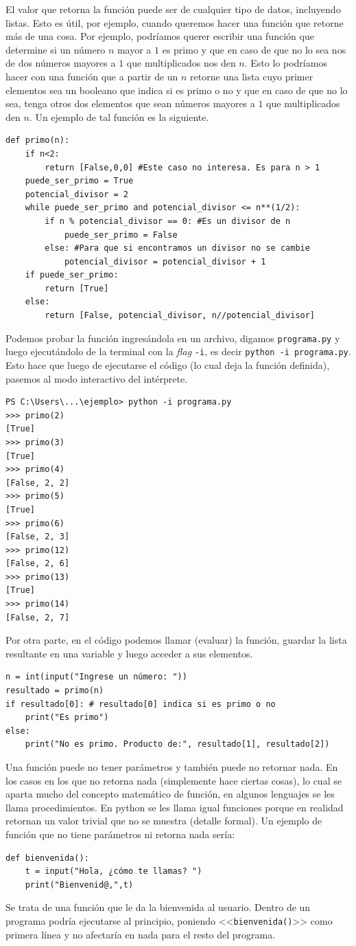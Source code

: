 \documentclass[a4paper, 12pt]{report}
\theoremstyle{definition}
\begin{document}
El valor que retorna la función puede ser de cualquier tipo de datos, incluyendo listas. Esto es útil, por ejemplo, cuando queremos hacer una función que retorne más de una cosa. Por ejemplo, podríamos querer escribir una función que determine si un número $n$ mayor a $1$ es primo y que en caso de que no lo sea nos de dos números mayores a $1$ que multiplicados nos den $n$. Esto lo podríamos hacer con una función que a partir de un $n$ retorne una lista cuyo primer elementos sea un booleano que indica si es primo o no y que en caso de que no lo sea, tenga otros dos elementos que sean números mayores a $1$ que multiplicados den $n$. Un ejemplo de tal función es la siguiente.
\begin{verbatim}
def primo(n):
    if n<2:
        return [False,0,0] #Este caso no interesa. Es para n > 1
    puede_ser_primo = True
    potencial_divisor = 2
    while puede_ser_primo and potencial_divisor <= n**(1/2):
        if n % potencial_divisor == 0: #Es un divisor de n
            puede_ser_primo = False
        else: #Para que si encontramos un divisor no se cambie
            potencial_divisor = potencial_divisor + 1
    if puede_ser_primo:
        return [True]
    else:
        return [False, potencial_divisor, n//potencial_divisor]
\end{verbatim}
Podemos probar la función ingresándola en un archivo, digamos {\tt programa.py} y luego ejecutándolo de la terminal con la {\sl flag} {\tt -i}, es decir {\tt python -i programa.py}. Esto hace que luego de ejecutarse el código (lo cual deja la función definida), pasemos al modo interactivo del intérprete.
\begin{verbatim}
PS C:\Users\...\ejemplo> python -i programa.py
>>> primo(2)
[True]
>>> primo(3)
[True]
>>> primo(4)
[False, 2, 2]
>>> primo(5)
[True]
>>> primo(6)
[False, 2, 3]
>>> primo(12)
[False, 2, 6]
>>> primo(13)
[True]
>>> primo(14)
[False, 2, 7]
\end{verbatim}
Por otra parte, en el código podemos llamar (evaluar) la función, guardar la lista resultante en una variable y luego acceder a sus elementos.
\begin{verbatim}
n = int(input("Ingrese un número: "))
resultado = primo(n)
if resultado[0]: # resultado[0] indica si es primo o no
    print("Es primo")
else:
    print("No es primo. Producto de:", resultado[1], resultado[2])
\end{verbatim}


Una función puede no tener parámetros y también puede no retornar nada. En los casos en los que no retorna nada (simplemente hace ciertas cosas), lo cual se aparta mucho del concepto matemático de función, en algunos lenguajes se les llama procedimientos. En python se les llama igual funciones porque en realidad retornan un valor trivial que no se muestra (detalle formal). Un ejemplo de función que no tiene parámetros ni retorna nada sería:
\begin{verbatim}
def bienvenida():
    t = input("Hola, ¿cómo te llamas? ")
    print("Bienvenid@,",t)
\end{verbatim}
Se trata de una función que le da la bienvenida al usuario. Dentro de un programa podría ejecutarse al principio, poniendo <<{\tt bienvenida()}>> como primera línea y no afectaría en nada para el resto del programa.
\end{document}
